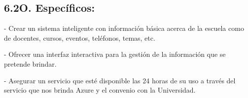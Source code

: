 \documentclass[12pt]{report}
\begin{document}
\subsection*{6.2\hspace*{10pt}O. Específicos:}
{\fontsize{10pt}{12.0pt}\selectfont - Crear un sistema inteligente con información básica acerca de la escuela como de docentes, cursos, eventos, teléfonos, temas, etc.\par}\par

{\fontsize{10pt}{12.0pt}\selectfont - Ofrecer una interfaz interactiva para la gestión de la información que se pretende brindar.\par}\par

{\fontsize{10pt}{12.0pt}\selectfont - Asegurar un servicio que esté disponible las 24 horas de su uso a través del servicio que nos brinda Azure y el convenio con la Universidad.\par}\par


\vspace{\baselineskip}
\setlength{\parskip}{9.96pt}



\newpage
\end{document}
